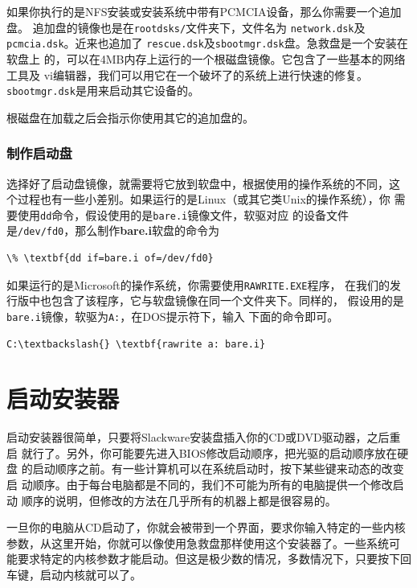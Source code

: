 如果你执行的是NFS安装或安装系统中带有PCMCIA设备，那么你需要一个追加盘。
追加盘的镜像也是在\texttt{rootdsks/}文件夹下，文件名为
\texttt{network.dsk}及\texttt{pcmcia.dsk}。近来也追加了
\texttt{rescue.dsk}及\texttt{sbootmgr.dsk}盘。急救盘是一个安装在软盘上
的，可以在4MB内存上运行的一个根磁盘镜像。它包含了一些基本的网络工具及
vi编辑器，我们可以用它在一个破坏了的系统上进行快速的修复。
\texttt{sbootmgr.dsk}是用来启动其它设备的。

根磁盘在加载之后会指示你使用其它的追加盘的。

\subsubsection{制作启动盘}
\label{sec:installation:systemRequirements:methods:makingTheDisks}
选择好了启动盘镜像，就需要将它放到软盘中，根据使用的操作系统的不同，这
个过程也有一些小差别。如果运行的是Linux（或其它类Unix的操作系统），你
需要使用\texttt{dd}命令，假设使用的是\texttt{bare.i}镜像文件，软驱对应
的设备文件是\texttt{/dev/fd0}，那么制作\textbf{bare.i}软盘的命令为

\begin{Verbatim}[frame=single, commandchars=\\\{\}]
\% \textbf{dd if=bare.i of=/dev/fd0}
\end{Verbatim}

如果运行的是Microsoft的操作系统，你需要使用\texttt{RAWRITE.EXE}程序，
在我们的发行版中也包含了该程序，它与软盘镜像在同一个文件夹下。同样的，
假设用的是\texttt{bare.i}镜像，软驱为\texttt{A:}，在DOS提示符下，输入
下面的命令即可。
\begin{Verbatim}[frame=single, commandchars=\\\{\}]
C:\textbackslash{} \textbf{rawrite a: bare.i}
\end{Verbatim}
\section{启动安装器}
\label{sec:installation:bootingTheInstaller}
启动安装器很简单，只要将Slackware安装盘插入你的CD或DVD驱动器，之后重启
就行了。另外，你可能要先进入BIOS修改启动顺序，把光驱的启动顺序放在硬盘
的启动顺序之前。有一些计算机可以在系统启动时，按下某些键来动态的改变启
动顺序。由于每台电脑都是不同的，我们不可能为所有的电脑提供一个修改启动
顺序的说明，但修改的方法在几乎所有的机器上都是很容易的。

一旦你的电脑从CD启动了，你就会被带到一个界面，要求你输入特定的一些内核
参数，从这里开始，你就可以像使用急救盘那样使用这个安装器了。一些系统可
能要求特定的内核参数才能启动。但这是极少数的情况，多数情况下，只要按下回
车键，启动内核就可以了。

